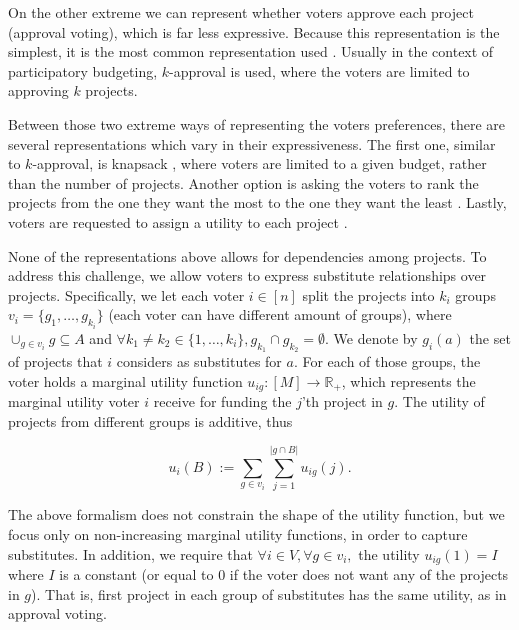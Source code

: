 \documentclass[runningheads]{llncs}
\begin{document}
On the other extreme we can represent whether voters approve each project (approval voting), 
which is far less expressive. 
Because this representation is the simplest, it is the most common representation used \cite{aziz2020participatory, aziz2017proportionally}.
Usually in the context of participatory budgeting, $k$-approval is used, where the voters are limited to approving $k$ projects.

Between those two extreme ways of representing the voters preferences, there are several 
representations which vary in their expressiveness. The first one,   similar to $k$-approval, is knapsack \cite{goel2019knapsack, goel2016knapsack, fluschnik2019fair}, where voters are  limited to a given budget, rather than the number of projects. Another option is asking the voters to rank the projects from the one they want the most to the one they want the least \cite{aziz2020expanding, benade2020preference}. Lastly, voters are requested to assign a utility to each project \cite{peters2020proportional}.


None of the representations above allows for dependencies among projects. To address this challenge, we allow voters to express substitute relationships over projects. Specifically, we let  each voter $i\in [n]$ split the projects into $k_i$ groups $v_i=\{g_1,\ldots,g_{k_i}\}$ (each voter can have different amount of groups), where $\cup_{g\in v_i}g\subseteq A$ and $\forall k_1\neq k_2 \in \{1,\ldots,k_i\}, g_{k_1}\cap g_{k_2}=\emptyset$.
 We denote by $g_i(a)$ the set of projects that $i$ considers as substitutes for $a$.
For each of those groups, the voter holds a marginal utility function $u_{ig}:[M]\rightarrow \mathbb{R}_+$, which represents the marginal utility voter $i$ receive for funding the $j$'th project in $g$. The utility of projects from different groups is additive, thus 

\vspace{-3mm}
$$u_i(B):=\sum_{g\in{v_i}}\sum_{j=1}^{|g\cap B|}u_{ig}(j).$$
 
 The above formalism does not constrain the shape of the utility function, but we focus only on non-increasing marginal utility functions, in order to capture substitutes.
In addition, we require that $\forall i\in V, \forall g\in v_i,$ the utility $u_{ig}(1)=I$ where $I$ is a constant (or equal to 0 if the voter does not want any of the projects in $g$). That is, first project in each group of substitutes has the same utility, as in approval voting. 
\end{document}
